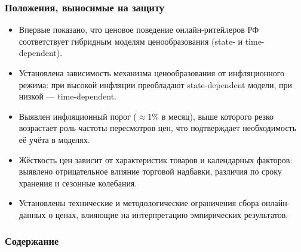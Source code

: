 \begin{frame}
    \setcounter{framenumber}{1}
    \maketitle
\end{frame}

\begin{frame}
	\frametitle{Положения, выносимые на защиту}
	\begin{itemize}
		\item Впервые показано, что ценовое поведение онлайн-ритейлеров РФ соответствует гибридным моделям ценообразования (state- и time-dependent).
		
		\item Установлена зависимость механизма ценообразования от инфляционного режима: при высокой инфляции преобладают state-dependent модели, при низкой — time-dependent.
		
		\item Выявлен инфляционный порог ($\approx$1\% в месяц), выше которого резко возрастает роль частоты пересмотров цен, что подтверждает необходимость её учёта в моделях.
		
		\item Жёсткость цен зависит от характеристик товаров и календарных факторов: выявлено отрицательное влияние торговой надбавки, различия по сроку хранения и сезонные колебания.
		
		\item Установлены технические и методологические ограничения сбора онлайн-данных о ценах, влияющие на интерпретацию эмпирических результатов.
	\end{itemize}
\end{frame}


\begin{frame}
    \frametitle{Содержание}
    \tableofcontents
\end{frame}
